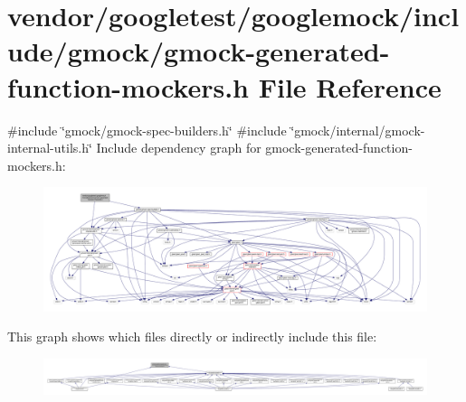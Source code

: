\hypertarget{gmock-generated-function-mockers_8h}{}\section{vendor/googletest/googlemock/include/gmock/gmock-\/generated-\/function-\/mockers.h File Reference}
\label{gmock-generated-function-mockers_8h}
{\ttfamily \#include \char`\"{}gmock/gmock-\/spec-\/builders.\+h\char`\"{}}\newline
{\ttfamily \#include \char`\"{}gmock/internal/gmock-\/internal-\/utils.\+h\char`\"{}}\newline
Include dependency graph for gmock-\/generated-\/function-\/mockers.h\+:
\nopagebreak
\begin{figure}[H]
\begin{center}
\leavevmode
\includegraphics[width=350pt]{gmock-generated-function-mockers_8h__incl}
\end{center}
\end{figure}
This graph shows which files directly or indirectly include this file\+:
\nopagebreak
\begin{figure}[H]
\begin{center}
\leavevmode
\includegraphics[width=350pt]{gmock-generated-function-mockers_8h__dep__incl}
\end{center}
\end{figure}

